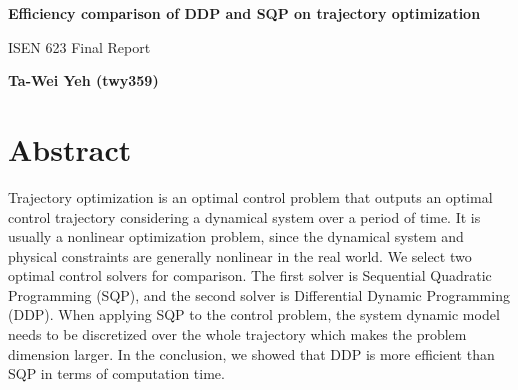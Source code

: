 \documentclass{article}
\begin{document}
\thispagestyle{plain}
\begin{center}
    \Large
    \textbf{Efficiency comparison of DDP and SQP on trajectory optimization}
        
    \vspace{0.4cm}
    \large
    ISEN 623 Final Report
        
    \vspace{0.4cm}
    \textbf{Ta-Wei Yeh (twy359)}
\end{center}

\section{Abstract}
Trajectory optimization is an optimal control problem that outputs an optimal control trajectory considering a dynamical system over a period of time.  It is usually a nonlinear optimization problem, since the dynamical system and physical constraints are generally nonlinear in the real world. We select two optimal control solvers for comparison. The first solver is Sequential Quadratic Programming (SQP), and the second solver is Differential Dynamic Programming (DDP). When applying SQP to the control problem, the system dynamic model needs to be discretized over the whole trajectory which makes the problem dimension larger. In the conclusion, we showed that DDP is more efficient than SQP in terms of computation time. 

\end{document}
